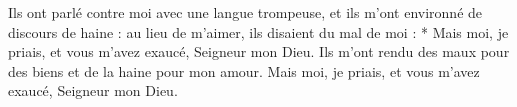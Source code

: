 Ils ont parlé contre moi avec une langue trompeuse, et ils m’ont environné de discours de haine : au lieu de m’aimer, ils disaient du mal de moi :
* Mais moi, je priais, et vous m’avez exaucé, Seigneur mon Dieu.
\versseparator
Ils m’ont rendu des maux pour des biens et de la haine pour mon amour.
\versseparator
Mais moi, je priais, et vous m’avez exaucé, Seigneur mon Dieu.